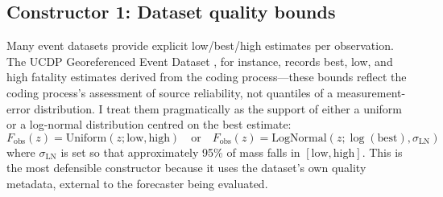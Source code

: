 \subsection*{Constructor 1: Dataset quality bounds}
Many event datasets provide explicit low/best/high estimates per observation. The UCDP Georeferenced Event Dataset \citep{ucdp_codebook}, for instance, records best, low, and high fatality estimates derived from the coding process---these bounds reflect the coding process's assessment of source reliability, not quantiles of a measurement-error distribution. I treat them pragmatically as the support of either a uniform or a log-normal distribution centred on the best estimate:
%
\begin{equation}
    F_\text{obs}(z) = \text{Uniform}(z; \text{low}, \text{high})
    \quad \text{or} \quad
    F_\text{obs}(z) = \text{LogNormal}(z; \log(\text{best}), \sigma_\text{LN})
\end{equation}
%
where $\sigma_\text{LN}$ is set so that approximately 95\% of mass falls in $[\text{low}, \text{high}]$. This is the most defensible constructor because it uses the dataset's own quality metadata, external to the forecaster being evaluated.

